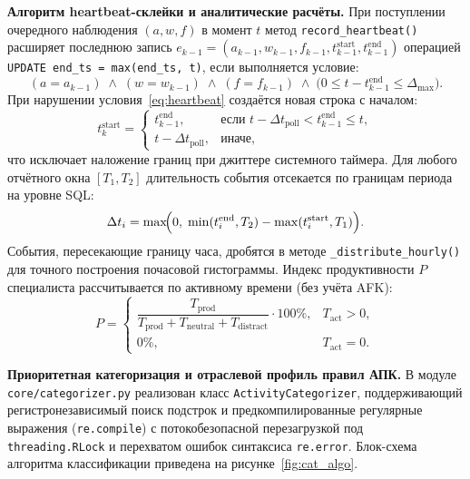 \documentclass{timcw}
\begin{document}
\textbf{Алгоритм heartbeat-склейки и аналитические расчёты.} При поступлении очередного наблюдения $(a, w, f)$ в момент $t$ метод \texttt{record\_heartbeat()} расширяет последнюю запись $e_{k-1} = (a_{k-1}, w_{k-1}, f_{k-1}, t_{k-1}^{\text{start}}, t_{k-1}^{\text{end}})$ операцией \texttt{UPDATE end\_ts = max(end\_ts, t)}, если выполняется условие:
\begin{equation}\label{eq:heartbeat}
  (a = a_{k-1}) \;\wedge\; (w = w_{k-1}) \;\wedge\; (f = f_{k-1}) \;\wedge\; \bigl(0 \le t - t_{k-1}^{\text{end}} \le \Delta_{\max}\bigr).
\end{equation}
При нарушении условия~\eqref{eq:heartbeat} создаётся новая строка с началом:
\begin{equation}\label{eq:new_start}
  t_k^{\text{start}} = \begin{cases}
    t_{k-1}^{\text{end}}, & \text{если } t - \Delta t_{\text{poll}} < t_{k-1}^{\text{end}} \le t, \\[4pt]
    t - \Delta t_{\text{poll}}, & \text{иначе,}
  \end{cases}
\end{equation}
что исключает наложение границ при джиттере системного таймера. Для любого отчётного окна $[T_1, T_2]$ длительность события отсекается по границам периода на уровне SQL:
\begin{equation}\label{eq:clip}
  \Delta t_i = \max\!\Bigl(0,\; \min(t_i^{\text{end}}, T_2) - \max(t_i^{\text{start}}, T_1)\Bigr).
\end{equation}
События, пересекающие границу часа, дробятся в методе \texttt{\_distribute\_hourly()} для точного построения почасовой гистограммы. Индекс продуктивности $P$ специалиста рассчитывается по активному времени (без учёта AFK):
\begin{equation}\label{eq:productivity}
  P = \begin{cases}
    \dfrac{T_{\text{prod}}}{T_{\text{prod}} + T_{\text{neutral}} + T_{\text{distract}}} \cdot 100\%, & T_{\text{act}} > 0, \\[10pt]
    0\%, & T_{\text{act}} = 0.
  \end{cases}
\end{equation}

\textbf{Приоритетная категоризация и отраслевой профиль правил АПК.} В модуле \texttt{core/categorizer.py} реализован класс \texttt{ActivityCategorizer}, поддерживающий регистронезависимый поиск подстрок и предкомпилированные регулярные выражения (\texttt{re.compile}) с потокобезопасной перезагрузкой под \texttt{threading.RLock} и перехватом ошибок синтаксиса \texttt{re.error}. Блок-схема алгоритма классификации приведена на рисунке~\ref{fig:cat_algo}.
\end{document}
